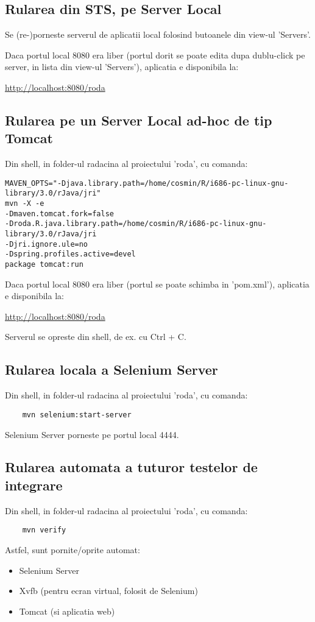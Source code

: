 \subsection{Rularea din STS, pe Server Local}
Se (re-)porneste serverul de aplicatii local folosind butoanele din view-ul
'Servers'.

Daca portul local 8080 era liber (portul dorit se poate edita dupa dublu-click pe
server, in lista din view-ul 'Servers'), aplicatia e disponibila la:

\url{http://localhost:8080/roda}

\subsection{Rularea pe un Server Local ad-hoc de tip Tomcat}
Din shell, in folder-ul radacina al proiectului 'roda', cu comanda:
\begin{lstlisting}
MAVEN_OPTS="-Djava.library.path=/home/cosmin/R/i686-pc-linux-gnu-library/3.0/rJava/jri" 
mvn -X -e 
-Dmaven.tomcat.fork=false 
-Droda.R.java.library.path=/home/cosmin/R/i686-pc-linux-gnu-library/3.0/rJava/jri 
-Djri.ignore.ule=no 
-Dspring.profiles.active=devel 
package tomcat:run
\end{lstlisting}
Daca portul local 8080 era liber (portul se poate schimba in 'pom.xml'),
aplicatia e disponibila la:

\url{http://localhost:8080/roda}

Serverul se opreste din shell, de ex. cu Ctrl + C.

\subsection{Rularea locala a Selenium Server}
Din shell, in folder-ul radacina al proiectului 'roda', cu comanda:
\begin{lstlisting}
	mvn selenium:start-server
\end{lstlisting}
Selenium Server porneste pe portul local 4444.

\subsection{Rularea automata a tuturor testelor de integrare}
Din shell, in folder-ul radacina al proiectului 'roda', cu comanda:
\begin{lstlisting}
	mvn verify
\end{lstlisting}
Astfel, sunt pornite/oprite automat:
\begin{itemize}
\item
Selenium Server
\item
Xvfb (pentru ecran virtual, folosit de Selenium)
\item
Tomcat (si aplicatia web)
\end{itemize}

